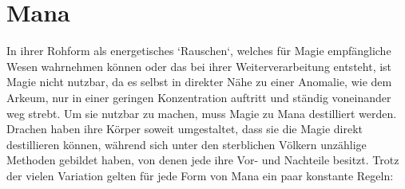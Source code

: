 \documentclass[a4paper,12pt,oneside]{book}
\begin{document}
\chapter{Mana}\label{Mana}
In ihrer Rohform als energetisches `Rauschen`, welches für Magie empfängliche  Wesen wahrnehmen können oder das bei ihrer Weiterverarbeitung entsteht, ist Magie nicht nutzbar, da es selbst in direkter Nähe zu einer Anomalie, wie dem Arkeum, nur in einer geringen Konzentration auftritt und ständig voneinander weg strebt. Um sie nutzbar zu machen, muss Magie zu Mana destilliert werden. Drachen haben ihre Körper soweit umgestaltet, dass sie die Magie direkt destillieren können, während sich unter den sterblichen Völkern unzählige Methoden gebildet haben, von denen jede ihre Vor- und Nachteile besitzt. Trotz der vielen Variation gelten für jede Form von Mana ein paar konstante Regeln:
\end{document}
